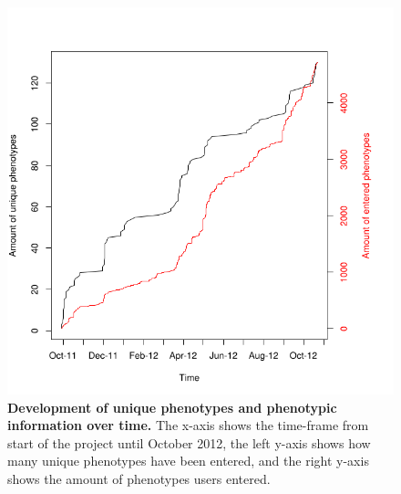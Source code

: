 \documentclass[10pt]{article}
\begin{document}
\begin{figure}[!ht]
	\begin{center}
		\includegraphics[scale=0.40]{25_10_2012_Graphs/phenotypes_vs_userphenotypes.png}
	\end{center}
	\caption{
	{\bf Development of unique phenotypes and phenotypic information over time.} The x-axis shows the time-frame from start of the project until October 2012, the left y-axis shows how many unique phenotypes have been entered, and the right y-axis shows the amount of phenotypes users entered.}
	\label{pheno}
\end{figure}
\end{document}
